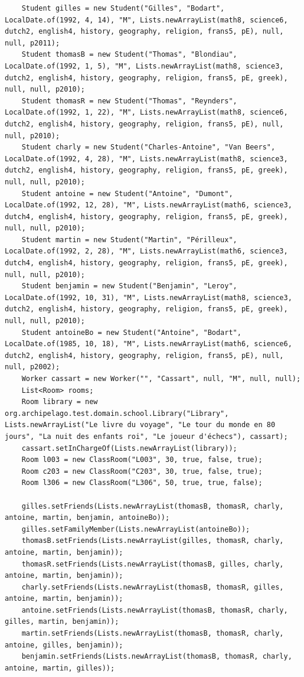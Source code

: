\documentclass[a4paper,fleqn,12pt]{report}
\begin{document}
\begin{lstlisting}
    Student gilles = new Student("Gilles", "Bodart", LocalDate.of(1992, 4, 14), "M", Lists.newArrayList(math8, science6, dutch2, english4, history, geography, religion, frans5, pE), null, null, p2011);
    Student thomasB = new Student("Thomas", "Blondiau", LocalDate.of(1992, 1, 5), "M", Lists.newArrayList(math8, science3, dutch2, english4, history, geography, religion, frans5, pE, greek), null, null, p2010);
    Student thomasR = new Student("Thomas", "Reynders", LocalDate.of(1992, 1, 22), "M", Lists.newArrayList(math8, science6, dutch2, english4, history, geography, religion, frans5, pE), null, null, p2010);
    Student charly = new Student("Charles-Antoine", "Van Beers", LocalDate.of(1992, 4, 28), "M", Lists.newArrayList(math8, science3, dutch2, english4, history, geography, religion, frans5, pE, greek), null, null, p2010);
    Student antoine = new Student("Antoine", "Dumont", LocalDate.of(1992, 12, 28), "M", Lists.newArrayList(math6, science3, dutch4, english4, history, geography, religion, frans5, pE, greek), null, null, p2010);
    Student martin = new Student("Martin", "Périlleux", LocalDate.of(1992, 2, 28), "M", Lists.newArrayList(math6, science3, dutch4, english4, history, geography, religion, frans5, pE, greek), null, null, p2010);
    Student benjamin = new Student("Benjamin", "Leroy", LocalDate.of(1992, 10, 31), "M", Lists.newArrayList(math8, science3, dutch2, english4, history, geography, religion, frans5, pE, greek), null, null, p2010);
    Student antoineBo = new Student("Antoine", "Bodart", LocalDate.of(1985, 10, 18), "M", Lists.newArrayList(math6, science6, dutch2, english4, history, geography, religion, frans5, pE), null, null, p2002);
    Worker cassart = new Worker("", "Cassart", null, "M", null, null);
    List<Room> rooms;
    Room library = new org.archipelago.test.domain.school.Library("Library", Lists.newArrayList("Le livre du voyage", "Le tour du monde en 80 jours", "La nuit des enfants roi", "Le joueur d'échecs"), cassart);
    cassart.setInChargeOf(Lists.newArrayList(library));
    Room l003 = new ClassRoom("L003", 30, true, false, true);
    Room c203 = new ClassRoom("C203", 30, true, false, true);
    Room l306 = new ClassRoom("L306", 50, true, true, false);

    gilles.setFriends(Lists.newArrayList(thomasB, thomasR, charly, antoine, martin, benjamin, antoineBo));
    gilles.setFamilyMember(Lists.newArrayList(antoineBo));
    thomasB.setFriends(Lists.newArrayList(gilles, thomasR, charly, antoine, martin, benjamin));
    thomasR.setFriends(Lists.newArrayList(thomasB, gilles, charly, antoine, martin, benjamin));
    charly.setFriends(Lists.newArrayList(thomasB, thomasR, gilles, antoine, martin, benjamin));
    antoine.setFriends(Lists.newArrayList(thomasB, thomasR, charly, gilles, martin, benjamin));
    martin.setFriends(Lists.newArrayList(thomasB, thomasR, charly, antoine, gilles, benjamin));
    benjamin.setFriends(Lists.newArrayList(thomasB, thomasR, charly, antoine, martin, gilles));


\end{lstlisting}
\end{document}
